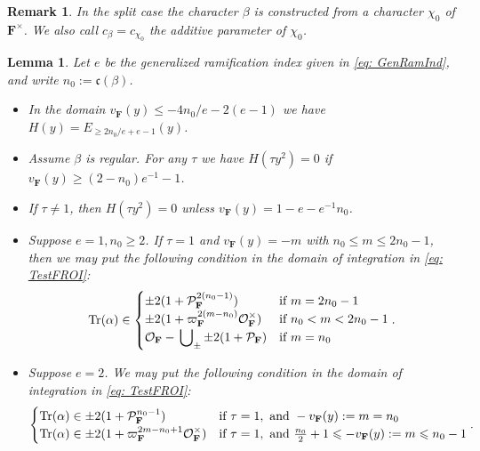 \documentclass[A4]{amsart}
\def\leq{\leqslant}
\def\geq{\geqslant}
\newtheorem{lemma}      [theorem]{Lemma}
\newtheorem{remark} [theorem] {Remark}
\numberwithin{equation}{section} \everymath{\displaystyle}
\newcommand{\Tr}{{\rm Tr}}
\newcommand{\F}{\mathbf{F}}
\newcommand{\vO}{\mathcal{O}}
\newcommand{\vP}{\mathcal{P}}
\newcommand{\cond}{\mathfrak{c}}
\begin{document}
 \begin{remark} \label{rmk: AddParMultChar}
 	In the split case the character $\beta$ is constructed from a character $\chi_0$ of $\F^{\times}$. We also call $c_{\beta} = c_{\chi_0}$ the additive parameter of $\chi_0$.
 \end{remark}

\begin{lemma} \label{lem: TestFAsymp}
	Let $e$ be the generalized ramification index given in \eqref{eq: GenRamInd}, and write $n_0 := \cond(\beta)$.
\begin{itemize}
	\item[(1)] In the domain $v_{\F}(y) \leq -4n_0/e-2(e-1)$ we have $H(y) = E_{\geq 2n_0/e+e-1}(y)$.
	\item[(2)] \emph{Assume $\beta$ is regular.} For any $\tau$ we have $H(\tau y^2) = 0$ if $v_{\F}(y) \geq (2-n_0)e^{-1}-1$.
	\item[(3)] If $\tau \neq 1$, then $H(\tau y^2) = 0$ unless $v_{\F}(y) = 1-e-e^{-1}n_0$.
	\item[(4)] Suppose $e=1, n_0 \geq 2$. If $\tau = 1$ and $v_{\F}(y) = -m$ with $n_0 \leq m \leq 2n_0-1$, then we may put the following condition in the domain of integration in \eqref{eq: TestFROI}:
	$$ \Tr(\alpha) \in 
	\begin{cases} 
		\pm 2(1+\vP_{\F}^{2(n_0-1)}) & \text{if } m=2n_0-1 \\
		\pm 2(1+\varpi_{\F}^{2(m-n_0)} \vO_{\F}^{\times}) & \text{if } n_0<m<2n_0-1 \\
		\vO_{\F} - \sideset{}{_{\pm}} \bigcup \pm 2(1+\vP_{\F}) & \text{if } m=n_0
	\end{cases}. $$
	\item[(5)] Suppose $e=2$. We may put the following condition in the domain of integration in \eqref{eq: TestFROI}:
	$$ \begin{cases}
		\Tr(\alpha) \in \pm 2(1+\vP_{\F}^{n_0-1}) & \text{if } \tau=1, \text{ and } -v_{\F}(y):=m = n_0 \\
		\Tr(\alpha) \in \pm 2(1+\varpi_{\F}^{2m-n_0+1} \vO_{\F}^{\times}) & \text{if } \tau=1, \text{ and } \tfrac{n_0}{2}+1 \leq -v_{\F}(y):=m \leq n_0-1
	\end{cases}. $$
\end{itemize}
\end{lemma}
\end{document}
